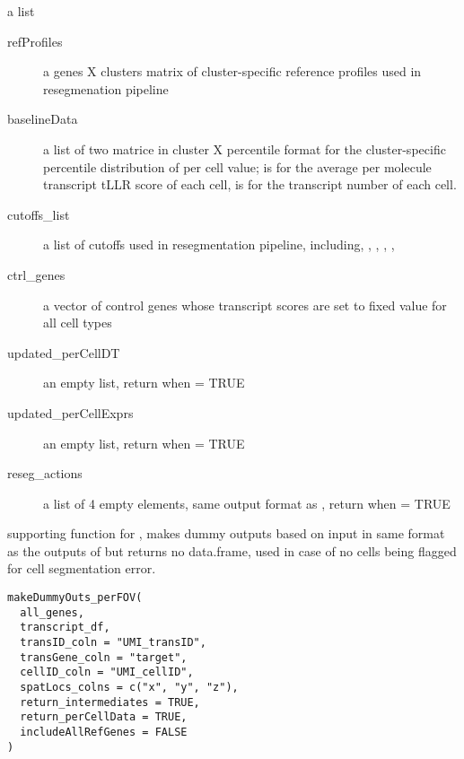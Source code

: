 \documentclass[letterpaper]{book}
\begin{document}
\begin{Value}
a list
\begin{description}

\item[refProfiles] a genes X clusters matrix of cluster-specific reference profiles used in resegmenation pipeline
\item[baselineData] a list of two matrice in cluster X percentile format for the cluster-specific percentile distribution of per cell value;  is for the average per molecule transcript tLLR score of each cell,  is for the transcript number of each cell.
\item[cutoffs\_list] a list of cutoffs used in resegmentation pipeline, including, , , , , 
\item[ctrl\_genes] a vector of control genes whose transcript scores are set to fixed value for all cell types
\item[updated\_perCellDT] an empty list, return when  = TRUE
\item[updated\_perCellExprs] an empty list, return when  = TRUE
\item[reseg\_actions] a list of 4 empty elements, same output format as , return when  = TRUE

\end{description}

\end{Value}
%
\begin{Description}
supporting function for , makes dummy outputs based on input  in same format as the outputs of  but returns no  data.frame, used in case of no cells being flagged for cell segmentation error.
\end{Description}
%
\begin{Usage}
\begin{verbatim}
makeDummyOuts_perFOV(
  all_genes,
  transcript_df,
  transID_coln = "UMI_transID",
  transGene_coln = "target",
  cellID_coln = "UMI_cellID",
  spatLocs_colns = c("x", "y", "z"),
  return_intermediates = TRUE,
  return_perCellData = TRUE,
  includeAllRefGenes = FALSE
)
\end{verbatim}
\end{Usage}
\end{document}
